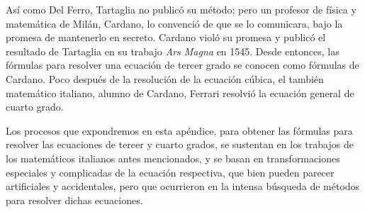 Así como Del Ferro, Tartaglia no publicó su método; pero un profesor de física y matemática de Milán, Cardano, lo convenció de que se lo comunicara, bajo la promesa de mantenerlo en secreto. Cardano violó su promesa y publicó el resultado de Tartaglia en su trabajo \textit{Ars Magna} en 1545. Desde entonces, las fórmulas para resolver una ecuación de tercer grado se conocen como fórmulas de Cardano. Poco después de la resolución de la ecuación cúbica, el también matemático italiano, alumno de Cardano, Ferrari resolvió la ecuación general de cuarto grado.

Los procesos que expondremos en esta apéndice, para obtener las fórmulas para resolver las ecuaciones de tercer y cuarto grados, se sustentan en los trabajos de los matemáticos italianos antes mencionados, y se basan en transformaciones especiales y complicadas de la ecuación respectiva, que bien pueden parecer artificiales y accidentales, pero que ocurrieron en la intensa búsqueda de métodos para resolver dichas ecuaciones.

